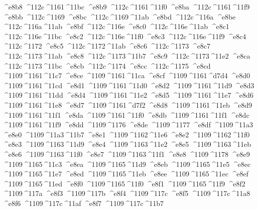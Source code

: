 \checkit ^^^^e8b8 ^^^^112c^^^^1161^^^^11bc
\checkit ^^^^e8b9 ^^^^112c^^^^1161^^^^11f0
\checkit ^^^^e8ba ^^^^112c^^^^1161^^^^11f9
\checkit ^^^^e8bb ^^^^112c^^^^1169
\checkit ^^^^e8bc ^^^^112c^^^^1169^^^^11ab
\checkit ^^^^e8bd ^^^^112c^^^^116a
\checkit ^^^^e8be ^^^^112c^^^^116a^^^^11ab
\checkit ^^^^e8bf ^^^^112c^^^^116e
\checkit ^^^^e8c0 ^^^^112c^^^^116e^^^^11ab
\checkit ^^^^e8c1 ^^^^112c^^^^116e^^^^11bc
\checkit ^^^^e8c2 ^^^^112c^^^^116e^^^^11f0
\checkit ^^^^e8c3 ^^^^112c^^^^116e^^^^11f9
\checkit ^^^^e8c4 ^^^^112c^^^^1172
\checkit ^^^^e8c5 ^^^^112c^^^^1172^^^^11ab
\checkit ^^^^e8c6 ^^^^112c^^^^1173
\checkit ^^^^e8c7 ^^^^112c^^^^1173^^^^11ab
\checkit ^^^^e8c8 ^^^^112c^^^^1173^^^^11b7
\checkit ^^^^e8c9 ^^^^112c^^^^1173^^^^11e2
\checkit ^^^^e8ca ^^^^112c^^^^1173^^^^11bc
\checkit ^^^^e8cb ^^^^112c^^^^1174
\checkit ^^^^e8cc ^^^^112c^^^^1175
\checkit ^^^^e8cd ^^^^1109^^^^1161^^^^11c7
\checkit ^^^^e8ce ^^^^1109^^^^1161^^^^11ca
\checkit ^^^^e8cf ^^^^1109^^^^1161^^^^d7d4
\checkit ^^^^e8d0 ^^^^1109^^^^1161^^^^11cd
\checkit ^^^^e8d1 ^^^^1109^^^^1161^^^^11d0
\checkit ^^^^e8d2 ^^^^1109^^^^1161^^^^11d9
\checkit ^^^^e8d3 ^^^^1109^^^^1161^^^^11dd
\checkit ^^^^e8d4 ^^^^1109^^^^1161^^^^11e2
\checkit ^^^^e8d5 ^^^^1109^^^^1161^^^^11e7
\checkit ^^^^e8d6 ^^^^1109^^^^1161^^^^11e8
\checkit ^^^^e8d7 ^^^^1109^^^^1161^^^^d7f2
\checkit ^^^^e8d8 ^^^^1109^^^^1161^^^^11eb
\checkit ^^^^e8d9 ^^^^1109^^^^1161^^^^11f1
\checkit ^^^^e8da ^^^^1109^^^^1161^^^^11f0
\checkit ^^^^e8db ^^^^1109^^^^1161^^^^11f1
\checkit ^^^^e8dc ^^^^1109^^^^1161^^^^11f9
\checkit ^^^^e8dd ^^^^1109^^^^1176
\checkit ^^^^e8de ^^^^1109^^^^1177
\checkit ^^^^e8df ^^^^1109^^^^11a3
\checkit ^^^^e8e0 ^^^^1109^^^^11a3^^^^11b7
\checkit ^^^^e8e1 ^^^^1109^^^^1162^^^^11e6
\checkit ^^^^e8e2 ^^^^1109^^^^1162^^^^11f0
\checkit ^^^^e8e3 ^^^^1109^^^^1163^^^^11d9
\checkit ^^^^e8e4 ^^^^1109^^^^1163^^^^11e2
\checkit ^^^^e8e5 ^^^^1109^^^^1163^^^^11eb
\checkit ^^^^e8e6 ^^^^1109^^^^1163^^^^11f0
\checkit ^^^^e8e7 ^^^^1109^^^^1163^^^^11f1
\checkit ^^^^e8e8 ^^^^1109^^^^1178
\checkit ^^^^e8e9 ^^^^1109^^^^1165^^^^11c3
\checkit ^^^^e8ea ^^^^1109^^^^1165^^^^11d9
\checkit ^^^^e8eb ^^^^1109^^^^1165^^^^11e5
\checkit ^^^^e8ec ^^^^1109^^^^1165^^^^11e7
\checkit ^^^^e8ed ^^^^1109^^^^1165^^^^11eb
\checkit ^^^^e8ee ^^^^1109^^^^1165^^^^11ec
\checkit ^^^^e8ef ^^^^1109^^^^1165^^^^11ed
\checkit ^^^^e8f0 ^^^^1109^^^^1165^^^^11f0
\checkit ^^^^e8f1 ^^^^1109^^^^1165^^^^11f9
\checkit ^^^^e8f2 ^^^^1109^^^^117a
\checkit ^^^^e8f3 ^^^^1109^^^^117b
\checkit ^^^^e8f4 ^^^^1109^^^^117c
\checkit ^^^^e8f5 ^^^^1109^^^^117c^^^^11a8
\checkit ^^^^e8f6 ^^^^1109^^^^117c^^^^11af
\checkit ^^^^e8f7 ^^^^1109^^^^117c^^^^11b7
